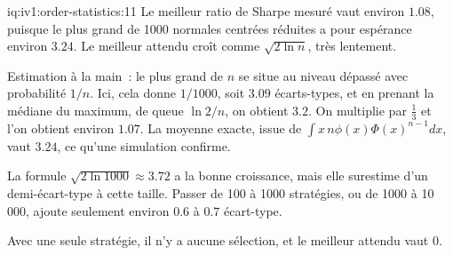 \begin{solution}{iq:iv1:order-statistics:11}
Le meilleur ratio de Sharpe mesuré vaut environ $1.08$, puisque le plus grand de 1000 normales centrées réduites a pour espérance environ $3.24$. Le meilleur attendu croît comme $\sqrt{2 \ln n}$, très lentement.

Estimation à la main~: le plus grand de $n$ se situe au niveau dépassé avec probabilité $1/n$. Ici, cela donne $1/1000$, soit $3.09$ écarts-types, et en prenant la médiane du maximum, de queue $\ln 2/n$, on obtient $3.2$. On multiplie par $\tfrac13$ et l'on obtient environ $1.07$. La moyenne exacte, issue de $\int x\, n\phi(x)\Phi(x)^{n - 1}dx$, vaut $3.24$, ce qu'une simulation confirme.

La formule $\sqrt{2 \ln 1000} \approx 3.72$ a la bonne croissance, mais elle surestime d'un demi-écart-type à cette taille. Passer de 100 à 1000 stratégies, ou de 1000 à 10\,000, ajoute seulement environ $0.6$ à $0.7$ écart-type.

Avec une seule stratégie, il n'y a aucune sélection, et le meilleur attendu vaut 0.

\end{solution}

